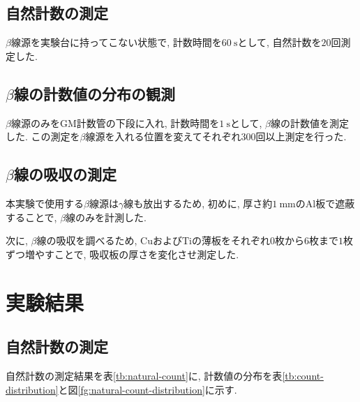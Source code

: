 \documentclass{jarticle}
\begin{document}
\subsection{自然計数の測定}

$\beta$線源を実験台に持ってこない状態で, 計数時間を$60\ \mathrm{s}$として, 自然計数を$20$回測定した.


\subsection{$\beta$線の計数値の分布の観測}

$\beta$線源のみをGM計数管の下段に入れ, 計数時間を$1\ \mathrm{s}$として, $\beta$線の計数値を測定した.
この測定を$\beta$線源を入れる位置を変えてそれぞれ$300$回以上測定を行った.


\subsection{$\beta$線の吸収の測定}

本実験で使用する$\beta$線源は$\gamma$線も放出するため, 初めに, 厚さ約$1\ \mathrm{mm}$の$\mathrm{Al}$板で遮蔽することで, $\beta$線のみを計測した.

次に, $\beta$線の吸収を調べるため, $\mathrm{Cu}$および$\mathrm{Ti}$の薄板をそれぞれ$0$枚から$6$枚まで$1$枚ずつ増やすことで, 吸収板の厚さを変化させ測定した.



\section{実験結果}


\subsection{自然計数の測定}

自然計数の測定結果を表\ref{tb:natural-count}に, 計数値の分布を表\ref{tb:count-distribution}と図\ref{fg:natural-count-distribution}に示す.
\end{document}
